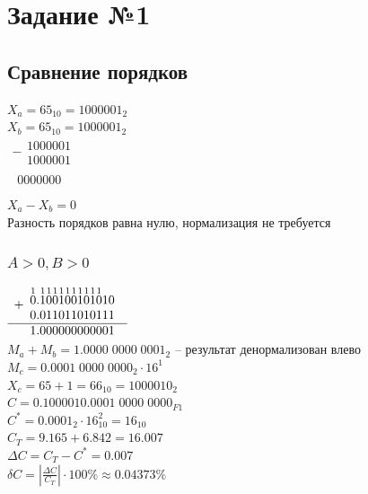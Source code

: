 \documentclass[12pt,a4paper]{report}
\begin{document}
\section*{Задание №1}
\subsection*{Сравнение порядков}
$X_a=65_{10}=1000001_2$\\
$X_b=65_{10}=1000001_2$\\
\hfill\break
$
        \begin{array}{r}
        -
        \begin{array}{r}
        1000001\\
        1000001
        \end{array}\\
        \hline
        \begin{array}{r}
        0000000
        \end{array}\\
        \end{array}
$\\
\hfill\break
$X_a-X_b=0$\\
Разность порядков равна нулю, нормализация не требуется
\subsubsection*{$A>0, B>0$}
$
    \begin{array}{r}
    +
    \begin{array}{r}
    \overset{\small{1}}{0}.\overset{\small{1}}{1}\overset{\small{1}}{0}\overset{\small{1}}{0}\overset{\small{1}}{1}\overset{\small{1}}{0}\overset{\small{1}}{0}\overset{\small{1}}{1}\overset{\small{1}}{0}\overset{\small{1}}{1}\overset{\small{1}}{0}10\\
    0.011011010111
    \end{array}\\
    \hline
    \begin{array}{r}
    1.000000000001
    \end{array}\\
    \end{array}
$\\
\hfill\break
$M_a+M_b=1.0000\;0000\;0001_2$ -- результат денормализован влево\\
$M_c=0.0001\;0000\;0000_2\cdot 16^1$\\
$X_c=65+1=66_{10}=1000010_2$\\
$C=0.1000010.0001\;0000\;0000_{F1}$\\
$C^*=0.0001_2\cdot16_{10}^2=16_{10}$\\
$C_T=9.165+6.842=16.007$\\
$\Delta C=C_T-C^*=0.007$\\
$\delta C=|\frac{\Delta C}{C_T}|\cdot100\%\approx0.04373\%$
\end{document}
